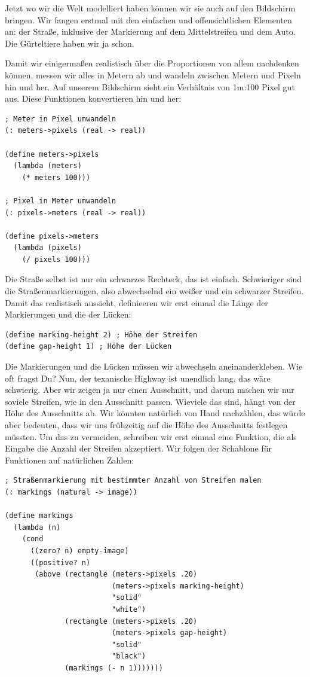 Jetzt wo wir die Welt modelliert haben können wir sie auch auf den
Bildschirm bringen.  Wir fangen erstmal mit den einfachen und
offensichtlichen Elementen an: der Straße, inklusive der
Markierung auf dem Mittelstreifen und dem Auto.  Die Gürteltiere
haben wir ja schon.

Damit wir einigermaßen realistisch über die Proportionen von allem
nachdenken können, messen wir alles in Metern ab und wandeln zwischen
Metern und Pixeln hin und her.  Auf unserem Bildschirm sieht ein
Verhältnis von 1m:100 Pixel gut aus.  Diese Funktionen konvertieren
hin und her:

\begin{lstlisting}
; Meter in Pixel umwandeln
(: meters->pixels (real -> real))

(define meters->pixels
  (lambda (meters)
    (* meters 100)))

; Pixel in Meter umwandeln
(: pixels->meters (real -> real))

(define pixels->meters
  (lambda (pixels)
    (/ pixels 100)))
\end{lstlisting}
%
Die Straße selbst ist nur ein schwarzes Rechteck, das ist einfach.
Schwieriger sind die Straßenmarkierungen, also abwechselnd ein weißer
und ein schwarzer Streifen.  Damit das realistisch aussieht,
definieeren wir erst einmal die Länge der Markierungen und die der Lücken:
%
\begin{lstlisting}
(define marking-height 2) ; Höhe der Streifen
(define gap-height 1) ; Höhe der Lücken
\end{lstlisting}
%
Die Markierungen und die Lücken müssen wir abwechseln
aneinanderkleben.  Wie oft fragst Du?  Nun, der texanische Highway ist
unendlich lang, das wäre schwierig.  Aber wir zeigen ja nur einen
Ausschnitt, und darum machen wir nur soviele Streifen, wie in den
Ausschnitt passen.  Wieviele das sind, hängt von der Höhe des
Ausschnitts ab.  Wir könnten natürlich von Hand nachzählen, das würde
aber bedeuten, dass wir uns frühzeitig auf die Höhe des Ausschnitts
festlegen müssten.  Um das zu vermeiden, schreiben wir erst einmal
eine Funktion, die als Eingabe die Anzahl der Streifen akzeptiert.
Wir folgen der Schablone für Funktionen auf natürlichen Zahlen:
%
\begin{lstlisting}
; Straßenmarkierung mit bestimmter Anzahl von Streifen malen
(: markings (natural -> image))

(define markings
  (lambda (n)
    (cond
      ((zero? n) empty-image)
      ((positive? n)
       (above (rectangle (meters->pixels .20)
                         (meters->pixels marking-height)
                         "solid"
                         "white")
              (rectangle (meters->pixels .20)
                         (meters->pixels gap-height)
                         "solid"
                         "black")
              (markings (- n 1)))))))
\end{lstlisting}
